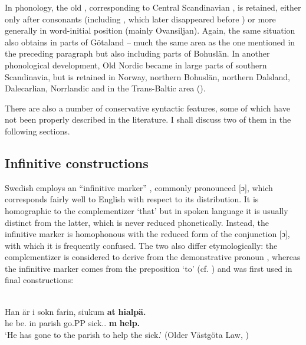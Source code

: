 In phonology, the old , corresponding to Central Scandinavian , is retained, either only after consonants (including , which later disappeared before ) or more generally in word-initial position (mainly Ovansiljan). Again, the same situation also obtains in parts of Götaland – much the same area as the one mentioned in the preceding paragraph but also including parts of Bohuslän. In another phonological development, Old Nordic  became in large parts of southern Scandinavia, but is retained in Norway, northern Bohuslän, northern Dalsland, Dalecarlian, Norrlandic and in the Trans-Baltic area (\citet[57]{Wessén1966}).

There are also a number of conservative syntactic features, some of which have not been properly described in the literature. I shall discuss two of them in the following sections.

\subsection{Infinitive constructions}
\label{sec:6.4.1}

Swedish employs an “infinitive marker” , commonly pronounced [ɔ], which corresponds fairly well to English with respect to its distribution. It is homographic to the complementizer  ‘that’ but in spoken language it is usually distinct from the latter, which is never reduced phonetically. Instead, the infinitive marker is homophonous with the reduced form of the conjunction  [ɔ], with which it is frequently confused. The two  also differ etymologically: the complementizer is considered to derive from the demonstrative pronoun , whereas the infinitive marker comes from the preposition  ‘to’ (cf. ) and was first used in final constructions: 

\ea\label{}
\\
\gll Han  är  i  sokn  farin,  siukum  \textbf{at} \textbf{hialpä.}\\
he  be.{\prs}  in  parish  go.PP  sick.{\dat}.{\pl}  \textbf{{{\inf}m}} \textbf{help.{\inf}}\\
\glt ‘He has gone to the parish to help the sick.’ (Older Västgöta Law, \citet[136]{Wessén1956}) 
\z

